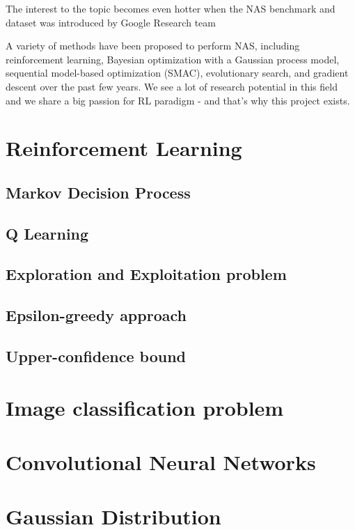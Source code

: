 The interest to the topic becomes even hotter when the NAS benchmark and dataset was introduced by Google Research team \cite{pmlr-v97-ying19a}

A variety of methods have been proposed to perform NAS, including reinforcement learning, Bayesian optimization with a Gaussian process model, sequential model-based optimization (SMAC), evolutionary search, and gradient descent over the past few years. We see a lot of research potential in this field and we share a big passion for RL paradigm - and that's why this project exists.

\section{Reinforcement Learning}

\subsection{Markov Decision Process}
\subsection{Q Learning}
\subsection{Exploration and Exploitation problem}
\subsection{Epsilon-greedy approach}
\subsection{Upper-confidence bound}
\section{Image classification problem}
\section{Convolutional Neural Networks}
\section{Gaussian Distribution}




